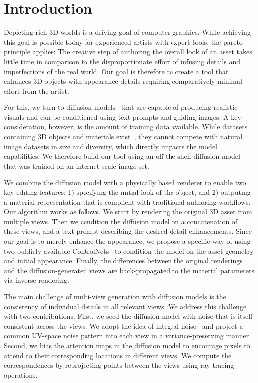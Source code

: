 \section{Introduction}
\label{sec:intro}


Depicting rich 3D worlds is a driving goal of computer graphics.
While achieving this goal is possible today for experienced artists with expert tools, the pareto principle applies:
The creative step of authoring the overall look of an asset takes little time in comparison to the disproportionate effort of infusing details and imperfections of the real world.
Our goal is therefore to create a tool that enhances 3D objects with appearance details requiring comparatively minimal effort from the artist.


For this, we turn to diffusion models~\cite{ho2020diffusion} that are capable of producing realistic visuals and can be conditioned using text prompts and guiding images.
A key consideration, however, is the amount of training data available.
While datasets containing 3D objects and materials exist~\cite{objaverse,vecchio2024matsynth}, they cannot compete with natural image datasets in size and diversity, which directly impacts the model capabilities.
We therefore build our tool using an off-the-shelf diffusion model that was trained on an internet-scale image set.



We combine the diffusion model with a physically based renderer to enable two key editing features: 1) specifying the initial look of the object, and 2) outputing a material representation that is complient with traditional authoring workflows.
Our algorithm works as follows.
We start by rendering the original 3D asset from multiple views.
Then we condition the diffusion model on a concatenation of these views, and a text prompt describing the desired detail enhancements.
Since our goal is to merely enhance the appearance, we propose a specific way of using two 
publicly available ControlNets~\cite{controlnet} to condition the model on the asset geometry and initial appearance.
Finally, the differences between the original renderings and the diffusion-generated views are back-propagated to the material parameters via inverse rendering.


The main challenge of multi-view generation with diffusion models is the consistency of individual details in all relevant views.
We address this challenge with two contributions. First, we seed the diffusion model with noise that is itself consistent across the views. 
We adopt the idea of integral noise~\cite{chang2024how} and project a common UV-space noise pattern into each view in a variance-preserving manner.
Second, we bias the attention maps in the diffusion model to encourage pixels to attend to their corresponding locations in different views.
We compute the correspondences by reprojecting points between the views using ray tracing operations.


